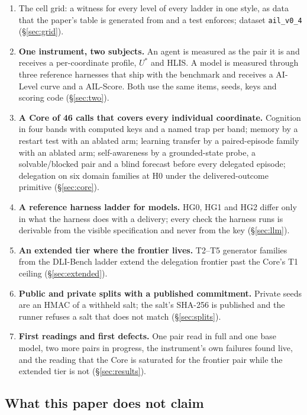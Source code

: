 \begin{enumerate}[leftmargin=*,itemsep=2pt]
\item The cell grid: a witness for every level of every ladder in one style, as data that the paper's table is generated from and a test enforces; dataset \texttt{ail\_v0\_4} (\S\ref{sec:grid}).
\item \textbf{One instrument, two subjects.} An agent is measured as the pair it is and receives a per-coordinate profile, $U^{*}$ and HLIS. A model is measured through three reference harnesses that ship with the benchmark and receives a AI-Level curve and a AIL-Score. Both use the same items, seeds, keys and scoring code (\S\ref{sec:two}).
\item \textbf{A Core of 46 calls that covers every individual coordinate.} Cognition in four bands with computed keys and a named trap per band; memory by a restart test with an ablated arm; learning transfer by a paired-episode family with an ablated arm; self-awareness by a grounded-state probe, a solvable/blocked pair and a blind forecast before every delegated episode; delegation on six domain families at H0 under the delivered-outcome primitive (\S\ref{sec:core}).
\item \textbf{A reference harness ladder for models.} HG0, HG1 and HG2 differ only in what the harness does with a delivery; every check the harness runs is derivable from the visible specification and never from the key (\S\ref{sec:llm}).
\item \textbf{An extended tier where the frontier lives.} T2--T5 generator families from the DLI-Bench ladder extend the delegation frontier past the Core's T1 ceiling (\S\ref{sec:extended}).
\item \textbf{Public and private splits with a published commitment.} Private seeds are an HMAC of a withheld salt; the salt's SHA-256 is published and the runner refuses a salt that does not match (\S\ref{sec:splits}).
\item \textbf{First readings and first defects.} One pair read in full and one base model, two more pairs in progress, the instrument's own failures found live, and the reading that the Core is saturated for the frontier pair while the extended tier is not (\S\ref{sec:results}).
\end{enumerate}

\subsection{What this paper does not claim}

